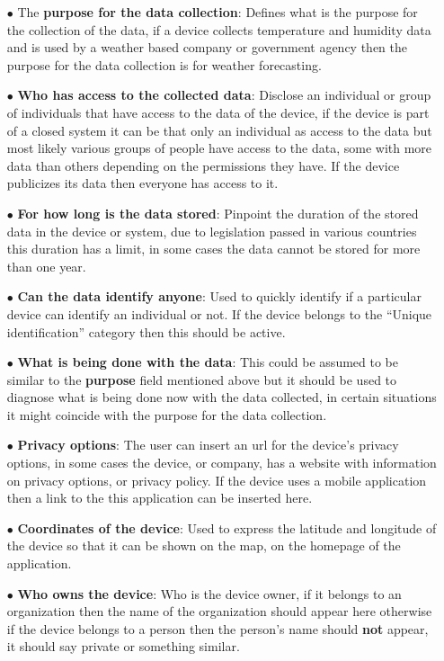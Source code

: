 \begin{itemize}
\begin{itemize}
    \end{itemize}
    \item[$\bullet$]
    The \textbf{purpose for the data collection}: Defines what is the purpose for the collection of the data, if a device collects temperature and humidity data and is used by a weather based company or government agency then the purpose for the data collection is for weather forecasting.
    \item[$\bullet$]
    \textbf{Who has access to the collected data}: Disclose an individual or group of individuals that have access to the data of the device, if the device is part of a closed system it can be that only an individual as access to the data but most likely various groups of people have access to the data, some with more data than others depending on the permissions they have. If the device publicizes its data then everyone has access to it.
    \item[$\bullet$]
    \textbf{For how long is the data stored}: Pinpoint the duration of the stored data in the device or system, due to legislation passed in various countries this duration has a limit, in some cases the data cannot be stored for more than one year.
    \item[$\bullet$]
    \textbf{Can the data identify anyone}: Used to quickly identify if a particular device can identify an individual or not. If the device belongs to the ``Unique identification'' category then this should be active.
    \item[$\bullet$]
    \textbf{What is being done with the data}: This could be assumed to be similar to the \textbf{purpose} field mentioned above but it should be used to diagnose what is being done now with the data collected, in certain situations it might coincide with the purpose for the data collection.
    \item[$\bullet$]
    \textbf{Privacy options}: The user can insert an url for the device's privacy options, in some cases the device, or company, has a website with information on privacy options, or privacy policy. If the device uses a mobile application then a link to the this application can be inserted here.
    \item[$\bullet$]
    \textbf{Coordinates of the device}: Used to express the latitude and longitude of the device so that it can be shown on the map, on the homepage of the application.
    \item[$\bullet$]
    \textbf{Who owns the device}: Who is the device owner, if it belongs to an organization then the name of the organization should appear here otherwise if the device belongs to a person then the person's name should \textbf{not} appear, it should say private or something similar.
\end{itemize}

